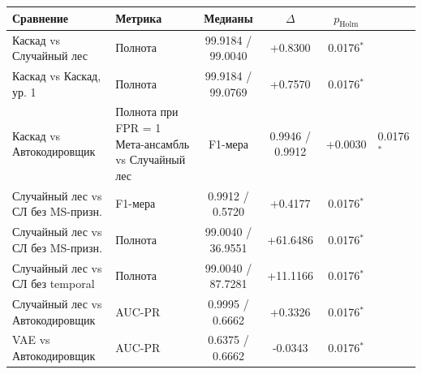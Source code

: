 \begin{tabular}{llccc}
\hline
Сравнение & Метрика & Медианы & $\Delta$ & $p_{\mathrm{Holm}}$ \\
\hline
Каскад vs Случайный лес & Полнота & 99.9184 / 99.0040 & +0.8300 & 0.0176$^{*}$ \\
Каскад vs Каскад, ур. 1 & Полнота & 99.9184 / 99.0769 & +0.7570 & 0.0176$^{*}$ \\
Каскад vs Автокодировщик & Полнота при FPR = 1 %
Мета-ансамбль vs Случайный лес & F1-мера & 0.9946 / 0.9912 & +0.0030 & 0.0176$^{*}$ \\
Случайный лес vs СЛ без MS-призн. & F1-мера & 0.9912 / 0.5720 & +0.4177 & 0.0176$^{*}$ \\
Случайный лес vs СЛ без MS-призн. & Полнота & 99.0040 / 36.9551 & +61.6486 & 0.0176$^{*}$ \\
Случайный лес vs СЛ без temporal & Полнота & 99.0040 / 87.7281 & +11.1166 & 0.0176$^{*}$ \\
Случайный лес vs Автокодировщик & AUC-PR & 0.9995 / 0.6662 & +0.3326 & 0.0176$^{*}$ \\
VAE vs Автокодировщик & AUC-PR & 0.6375 / 0.6662 & -0.0343 & 0.0176$^{*}$ \\
\hline
\end{tabular}